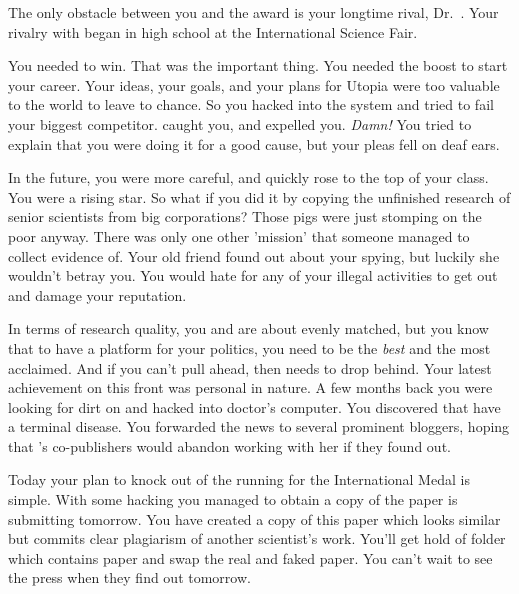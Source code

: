 \documentclass[char]{guildcamp1}
\begin{document}
The only obstacle between you and the award is your longtime rival, Dr.~\cScientist{\intro}.  Your rivalry with \cScientist{} began in high school at the International Science Fair.  %

You needed to win. That was the important thing. You needed the boost to start your career. Your ideas, your goals, and your plans for Utopia were too valuable to the world to leave to chance. So you hacked into the system and tried to fail your biggest competitor. \cScientist{} caught you, and expelled you. \emph{Damn!} You tried to explain that you were doing it for a good cause, but your pleas fell on deaf ears.

In the future, you were more careful, and quickly rose to the top of your class. You were a rising star. So what if you did it by copying the unfinished research of senior scientists from big corporations? Those pigs were just stomping on the poor anyway. There was only one other 'mission' that someone managed to collect evidence of.  Your old friend \cBride{} found out about your spying, but luckily she wouldn't betray you.  You would hate for any of your illegal activities to get out and damage your reputation.

In terms of research quality, you and \cScientist{} are about evenly matched, but you know that to have a platform for your politics, you need to be the \emph{best} and the most acclaimed. And if you can't pull ahead, then \cScientist{} needs to drop behind. Your latest achievement on this front was personal in nature. A few months back you were looking for dirt on \cScientist{} and hacked into \cScientist{\Their} doctor's computer. You discovered that \cScientist{\They{}} have a terminal disease. You forwarded the news to several prominent bloggers, hoping that \cScientist{}'s co-publishers would abandon working with her if they found out.

Today your plan to knock \cScientist{} out of the running for the International Medal is simple.  With some hacking you managed to obtain a copy of the paper \cScientist{\they} is submitting tomorrow.  You have created a copy of this paper which looks similar but commits clear plagiarism of another scientist's work.  You'll get hold of \cScientist{\their} folder which contains \cScientist{\their} paper and swap the real and faked paper.  You can't wait to see the press when they find out tomorrow.
\end{document}
